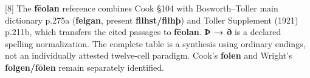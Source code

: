 [8] The \textbf{fēolan} reference combines Cook §104 with Bosworth–Toller main dictionary p.275a (\textbf{felgan}, present \textbf{filhst/\allowbreak{}filhþ}) and Toller Supplement (1921) p.211b, which transfers the cited passages to \textbf{fēolan}. \textbf{Þ → ð} is a declared spelling normalization. The complete table is a synthesis using ordinary endings, not an individually attested twelve-cell paradigm. Cook's \textbf{folen} and Wright's \textbf{folgen/\allowbreak{}fōlen} remain separately identified.

\endgroup

\par\label{end-ch04-key}
\clearpage\endgroup
